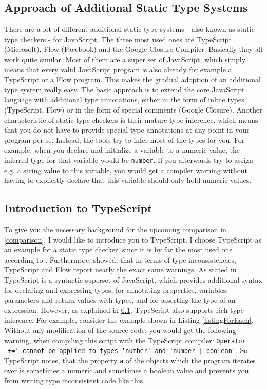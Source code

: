 \documentclass[runningheads,a4paper]{llncs}
\begin{document}
\subsection{Approach of Additional Static Type Systems} \label{staticTypeSystems}
There are a lot of different additional static type systems - also known as static type checkers - for JavaScript.
The three most used ones are TypeScript (Microsoft), Flow (Facebook) and the Google Closure Compiler.
Basically they all work quite similar.
Most of them are a super set of JavaScript, which simply means that every valid JavaScript program is also already for example a TypeScript or a Flow program.
This makes the gradual adoption of an additional type system really easy.
The basic approach is to extend the core JavaScript language with additional type annotations, either in the form of inline types (TypeScript, Flow) or in the form of special comments (Google Closure).
Another characteristic of static type checkers is their mature type inference, which means that you do not have to provide special type annotations at any point in your program per se.
Instead, the tools try to infer most of the types for you. 
For example, when you declare and initialize a variable to a numeric value, the inferred type for that variable would be \lstinline[columns=fixed]{number}.
If you afterwards try to assign e.g. a string value to this variable, you would get a compiler warning without having to explicitly declare that this variable should only hold numeric values.


\subsection{Introduction to TypeScript}
To give you the necessary background for the upcoming comparison in \ref{comparison}, I would like to introduce you to TypeScript.
I choose TypeScript as an example for a static type checker, since it is by far the most used one according to \cite{StateOfJs}.
Furthermore, \cite{DBLP:conf/icse/GaoBB17} showed, that in terms of type inconsistencies, TypeScript and Flow report nearly the exact same warnings.
As stated in \cite{DBLP:conf/ecoop/BiermanAT14}, TypeScript is a syntactic superset of JavaScript, which provides additional syntax for declaring and expressing types, for annotating properties, variables, parameters and return values with types, and for asserting the type of an expression.
However, as explained in \ref{staticTypeSystems}, TypeScript also supports rich type inference.
For example, consider the example shown in Listing \ref{listingForEach}.
Without any modification of the source code, you would get the following warning, when compiling this script with the TypeScript compiler:
\lstinline[columns=fixed]{Operator '+=' cannot be applied to types 'number' and 'number | boolean'}.
So TypeScript notes, that the property \lstinline[columns=fixed]{a} of the objects which the program iterates over is sometimes a numeric and sometimes a boolean value and prevents you from writing type inconsistent code like this.
\end{document}
